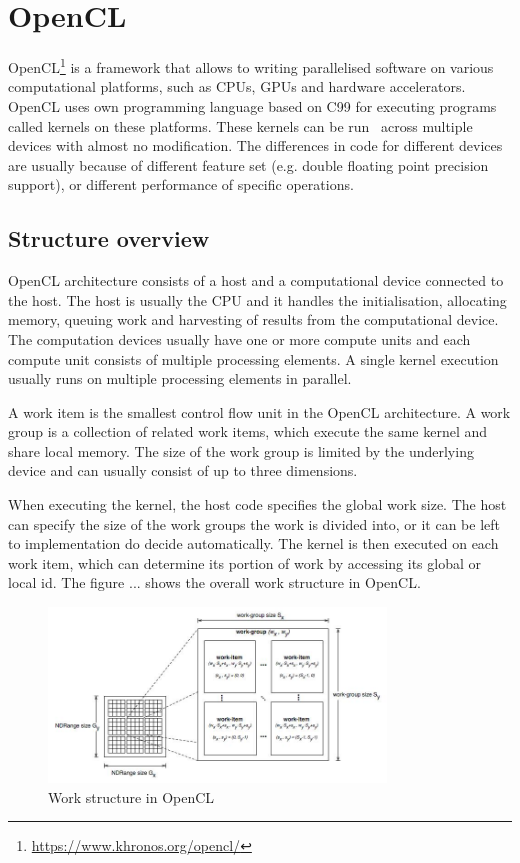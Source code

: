 \documentclass{l4proj}
\begin{document}
\section{OpenCL}

OpenCL\footnote{\url{https://www.khronos.org/opencl/}} is a framework that allows to writing parallelised software on various computational
platforms, such as CPUs, GPUs and hardware accelerators. OpenCL uses own programming language
based on C99 for executing programs called kernels on these platforms. These kernels can be run \
across multiple devices with almost no modification. The differences in code for different devices are 
usually because of different feature set (e.g. double floating point precision support), or
different performance of specific operations.

\subsection{Structure overview}

OpenCL architecture consists 
of a host and a computational device connected to the host.
The host is usually the CPU and it handles the initialisation, allocating memory, queuing work
and harvesting of results from the computational device. The computation devices usually have one
or more compute units and each compute unit consists of multiple processing elements. A single kernel
execution usually runs on multiple processing elements in parallel.

A work item is the smallest control flow unit in the OpenCL architecture. A work group is a 
collection of related work items, which execute the same kernel and share local memory.
The size of the work group is limited by the underlying device and can usually consist of up to 
three dimensions.

When executing the kernel, the host code specifies the global work size. The host can specify 
the size of the work groups the work is divided into, or it can be left to implementation do decide
automatically. The kernel is then executed on each work item, which can determine its portion 
of work by accessing its global or local id. The figure ... shows the overall work structure in OpenCL.

\begin{figure}
\centering
\includegraphics[width=0.8\textwidth]{images/opencl.jpg}
\caption{Work structure in OpenCL \protect\footnotemark}
\label{fig:opencl}
\end{figure}
\end{document}
